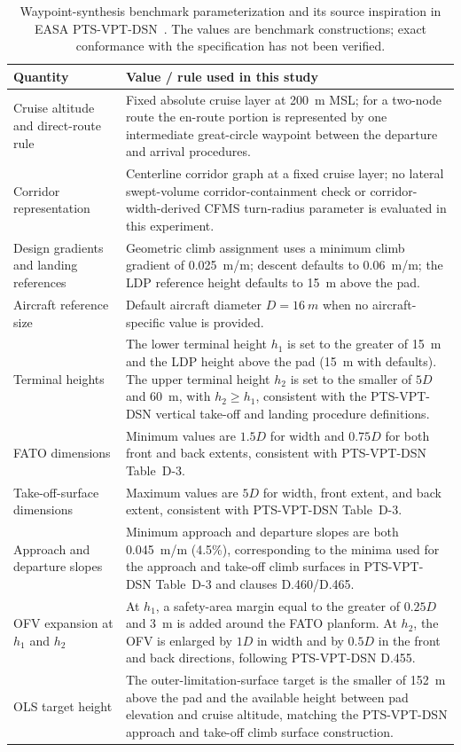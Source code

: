 \begin{table}[H]
    \centering
    \caption{Waypoint-synthesis benchmark parameterization and its source inspiration in EASA PTS-VPT-DSN~\cite{easa2022_pts_vpt_dsn}. The values are benchmark constructions; exact conformance with the specification has not been verified.}
    \label{tab:waypoint_params}
    \small
    \begin{tabularx}{\textwidth}{lX}
        \toprule
        Quantity & Value / rule used in this study \\
        \midrule
        Cruise altitude and direct-route rule & Fixed absolute cruise layer at \SI{200}{m} MSL; for a two-node route the en-route portion is represented by one intermediate great-circle waypoint between the departure and arrival procedures. \\
        Corridor representation & Centerline corridor graph at a fixed cruise layer; no lateral swept-volume corridor-containment check or corridor-width-derived CFMS turn-radius parameter is evaluated in this experiment. \\
        Design gradients and landing references & Geometric climb assignment uses a minimum climb gradient of 0.025~m/m; descent defaults to 0.06~m/m; the LDP reference height defaults to \SI{15}{m} above the pad. \\
        Aircraft reference size & Default aircraft diameter \(D=\SI{16}{m}\) when no aircraft-specific value is provided. \\
        Terminal heights & The lower terminal height \(h_1\) is set to the greater of \SI{15}{m} and the LDP height above the pad (\SI{15}{m} with defaults). The upper terminal height \(h_2\) is set to the smaller of \(5D\) and \SI{60}{m}, with \(h_2 \ge h_1\), consistent with the PTS-VPT-DSN vertical take-off and landing procedure definitions. \\
        FATO dimensions & Minimum values are \(1.5D\) for width and \(0.75D\) for both front and back extents, consistent with PTS-VPT-DSN Table~D-3. \\
        Take-off-surface dimensions & Maximum values are \(5D\) for width, front extent, and back extent, consistent with PTS-VPT-DSN Table~D-3. \\
        Approach and departure slopes & Minimum approach and departure slopes are both 0.045~m/m (4.5\%), corresponding to the minima used for the approach and take-off climb surfaces in PTS-VPT-DSN Table~D-3 and clauses D.460/D.465. \\
        OFV expansion at \(h_1\) and \(h_2\) & At \(h_1\), a safety-area margin equal to the greater of \(0.25D\) and \SI{3}{m} is added around the FATO planform. At \(h_2\), the OFV is enlarged by \(1D\) in width and by \(0.5D\) in the front and back directions, following PTS-VPT-DSN D.455. \\
        OLS target height & The outer-limitation-surface target is the smaller of \SI{152}{m} above the pad and the available height between pad elevation and cruise altitude, matching the PTS-VPT-DSN approach and take-off climb surface construction. \\
        \bottomrule
    \end{tabularx}
\end{table}

